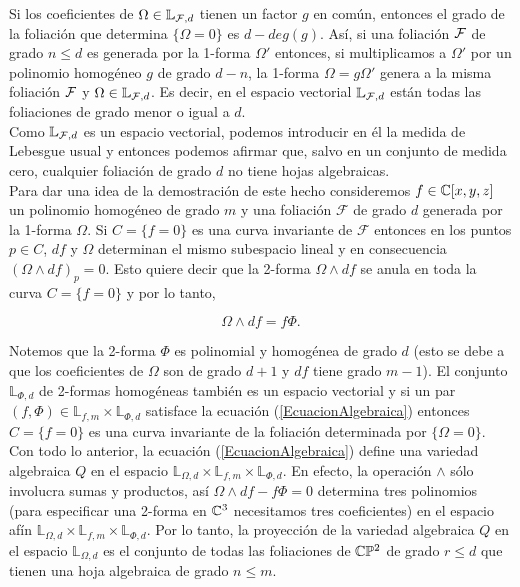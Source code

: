Si los coeficientes de $\Omega\in\mathbb{L}_{\mathcal{F},d}$ tienen un factor $g$ en común, entonces el grado de la foliación que determina $\{\Omega =0\}$ es $d-deg(g)$. Así, si una foliación $\mathcal{F}$ de grado $n\leq d$ es generada por la 1-forma $\Omega'$ entonces, si multiplicamos a $\Omega'$ por un polinomio homogéneo $g$ de grado $d-n$, la 1-forma $\Omega=g\Omega'$ genera a la misma foliación $\mathcal{F}$ y $\Omega\in\mathbb{L}_{\mathcal{F},d}$. Es decir, en el espacio vectorial $\mathbb{L}_{\mathcal{F},d}$ están todas las foliaciones de grado menor o igual a $d$.\\

Como $\mathbb{L}_{\mathcal{F},d}$ es un espacio vectorial, podemos introducir en él la medida de Lebesgue usual y entonces podemos afirmar que, salvo en un conjunto de medida cero, cualquier foliación de grado $d$ no tiene hojas algebraicas.\\

Para dar una idea de la demostración de este hecho consideremos $f\in\mathbb{C}[x,y,z]$ un polinomio homogéneo  de grado $m$  y una foliación $\mathcal{F}$ de grado $d$ generada por la 1-forma $\Omega$. Si $C=\{f=0\}$ es una curva invariante de $\mathcal{F}$ entonces en los puntos $p\in C$, $df$ y $\Omega$ determinan el mismo subespacio lineal y en consecuencia $(\Omega\wedge df)_{p}=0$. Esto quiere decir que la 2-forma $\Omega\wedge df$ se anula en toda la curva $C=\{f=0\}$ y por lo tanto,

\begin{equation}
\label{EcuacionAlgebraica} 
\Omega\wedge df=f\Phi.
\end{equation}

\noindent Notemos que la 2-forma $\Phi$ es polinomial y homogénea de grado $d$ (esto se debe a que los coeficientes de $\Omega$ son de grado $d+1$ y $df$ tiene grado $m-1$). El conjunto $\mathbb{L}_{\Phi,d}$ de 2-formas homogéneas también es un espacio vectorial y si un par $(f,\Phi)\in\mathbb{L}_{f,m}\times\mathbb{L}_{\Phi,d}$ satisface la ecuación (\ref{EcuacionAlgebraica}) entonces $C=\{f=0\}$ es una curva invariante de la foliación determinada por $\{\Omega=0\}$.\\

Con todo lo anterior, la ecuación (\ref{EcuacionAlgebraica}) define una variedad algebraica $Q$ en el espacio $\mathbb{L}_{\Omega,d}\times\mathbb{L}_{f,m}\times\mathbb{L}_{\Phi,d}$. En efecto, la operación $\wedge$ sólo involucra sumas y productos, así $\Omega\wedge df-f\Phi=0$ determina tres polinomios (para especificar una 2-forma en $\mathbb{C}^{3}$ necesitamos tres coeficientes) en el espacio afín $\mathbb{L}_{\Omega,d}\times\mathbb{L}_{f,m}\times\mathbb{L}_{\Phi,d}$. Por lo tanto, la proyección de la variedad algebraica $Q$ en el espacio $\mathbb{L}_{\Omega,d}$ es el conjunto de todas las foliaciones de $\mathbb{C}\mathbb{P}^2$ de grado $r\leq d$ que tienen una hoja algebraica de grado $n\leq m$.\\

